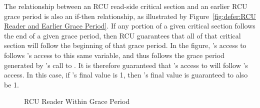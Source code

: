 The relationship between an RCU read-side critical section and an earlier
RCU grace period is also an if-then relationship, as illustrated by
Figure~\ref{fig:defer:RCU Reader and Earlier Grace Period}.
If any portion of a given critical section follows the end of
a given grace period, then RCU guarantees that all of that critical
section will follow the beginning of that grace period.
In the figure, 's access to  follows 's access
to this same variable, and thus follows the grace period generated by
's call to .
It is therefore guaranteed that 's access to  will follow
's access.  In this case, if 's final value is 1, then
's final value is guaranteed to also be 1.

\QuickQuizEnd

\begin{figure}[tbp]
\centering
{}
\caption{RCU Reader Within Grace Period}
\label{fig:defer:RCU Reader Within Grace Period}
\end{figure}

